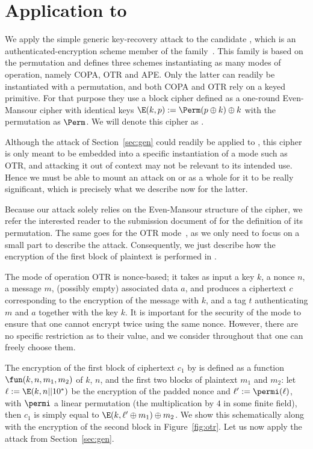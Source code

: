 \section{Application to \proestotr}
\label{sec:appli}

We apply the simple generic key-recovery attack to the \caesar candidate \proestotr, which is an authenticated-encryption
scheme member of the \proest family~\cite{proest}. This family is based on the \proest permutation and defines
three schemes instantiating as many modes of operation, namely COPA, OTR and APE. Only
the latter can readily be instantiated with a permutation, and both COPA and OTR rely on a keyed primitive. For that purpose
they use a block cipher defined as a one-round Even-Mansour cipher with identical keys
$\E(k,p) := \Perm(p \oplus k) \oplus k$
with the \proest permutation as $\Perm$. We will denote this cipher as \proestem.

Although the attack of Section~\ref{sec:gen} could readily be applied to \proestem, this cipher is only
meant to be embedded into a specific instantiation of a mode such as OTR, and attacking it out of context may not
be relevant to its intended use.
Hence we must
be able to mount an attack on \proestcopa or \proestotr as a whole for it to be really significant,
which is precisely what we describe now for the latter.

Because our attack solely relies on the Even-Mansour structure of the cipher, we refer the interested reader to the
submission document of \proest for the definition of its permutation.
The same goes for the OTR mode~\cite{M14}, as we only need to focus on a small part to describe the attack.
Consequently, we just describe how the encryption of the first block of plaintext is performed in \proestotr.

\medskip

The mode of operation OTR is nonce-based; it takes as input a key $k$, a nonce $n$, a message $m$,
(possibly empty) associated data $a$, and produces a ciphertext $c$ corresponding
to the encryption of the message with $k$, and a tag $t$ authenticating $m$ and
$a$ together with the key $k$. It is important for the security of the mode to ensure
that one cannot encrypt twice using the same nonce. However, there are no
specific restriction as to their value, and we consider throughout that one
can freely choose them.

The encryption of the first block of ciphertext $c_1$ by \proestotr is defined as a function
$\fun(k, n, m_1, m_2)$
of $k$, $n$, and the first two blocks of plaintext $m_1$ and $m_2$:
let $\ell := \E(k, n || 10^*)$ be the encryption of the padded nonce and
$\ell' := \permi(\ell)$, with $\permi$ a linear permutation (the multiplication by $4$ in some finite field),
then $c_1$ is simply equal to $\E(k, \ell' \oplus m_1) \oplus m_2$. We show this schematically along with the encryption
of the second block in Figure~\ref{fig:otr}.
Let us now apply the attack from Section~\ref{sec:gen}.

